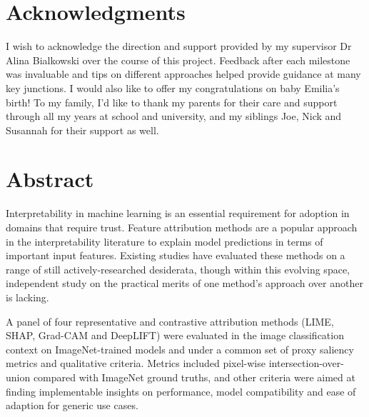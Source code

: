 \documentclass[12pt,openany,a4paper]{book}
\begin{document}
\frontmatter



\cleardoublepage



\cleardoublepage


\chapter{Acknowledgments}

I wish to acknowledge the direction and support provided by my supervisor Dr Alina Bialkowski over the course of this project. Feedback after each milestone was invaluable and tips on different approaches helped provide guidance at many key junctions. I would also like to offer my congratulations on baby Emilia's birth! To my family, I'd like to thank my parents for their care and support through all my years at school and university, and my siblings Joe, Nick and Susannah for their support as well.

\cleardoublepage

\chapter{Abstract}

Interpretability in machine learning is an essential requirement for adoption in domains that require trust. Feature attribution methods are a popular approach in the interpretability literature to explain model predictions in terms of important input features. Existing studies have evaluated these methods on a range of still actively-researched desiderata, though within this evolving space, independent study on the practical merits of one method's approach over another is lacking.

\vspace{0.15in}

\noindent A panel of four representative and contrastive attribution methods (LIME, SHAP, Grad-CAM and DeepLIFT) were evaluated in the image classification context on ImageNet-trained models and under a common set of proxy saliency metrics and qualitative criteria. Metrics included pixel-wise intersection-over-union compared with ImageNet ground truths, and other criteria were aimed at finding implementable insights on performance, model compatibility and ease of adaption for generic use cases.

\vspace{0.15in}
\end{document}
